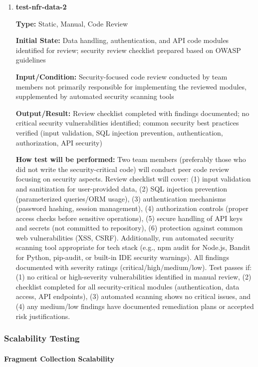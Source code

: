 \documentclass[12pt, titlepage]{article}
\begin{document}
\begin{enumerate}
\item \textbf{test-nfr-data-2}

\textbf{Type:} Static, Manual, Code Review

\textbf{Initial State:} Data handling, authentication, and API code modules identified for review; security review checklist prepared based on OWASP guidelines

\textbf{Input/Condition:} Security-focused code review conducted by team members not primarily responsible for implementing the reviewed modules, supplemented by automated security scanning tools

\textbf{Output/Result:} Review checklist completed with findings documented; no critical security vulnerabilities identified; common security best practices verified (input validation, SQL injection prevention, authentication, authorization, API security)

\textbf{How test will be performed:} Two team members (preferably those who did not write the security-critical code) will conduct peer code review focusing on security aspects. Review checklist will cover: (1) input validation and sanitization for user-provided data, (2) SQL injection prevention (parameterized queries/ORM usage), (3) authentication mechanisms (password hashing, session management), (4) authorization controls (proper access checks before sensitive operations), (5) secure handling of API keys and secrets (not committed to repository), (6) protection against common web vulnerabilities (XSS, CSRF). Additionally, run automated security scanning tool appropriate for tech stack (e.g., npm audit for Node.js, Bandit for Python, pip-audit, or built-in IDE security warnings). All findings documented with severity ratings (critical/high/medium/low). Test passes if: (1) no critical or high-severity vulnerabilities identified in manual review, (2) checklist completed for all security-critical modules (authentication, data access, API endpoints), (3) automated scanning shows no critical issues, and (4) any medium/low findings have documented remediation plans or accepted risk justifications.

\end{enumerate}

\subsubsection{Scalability Testing}

\paragraph{Fragment Collection Scalability}
\end{document}
